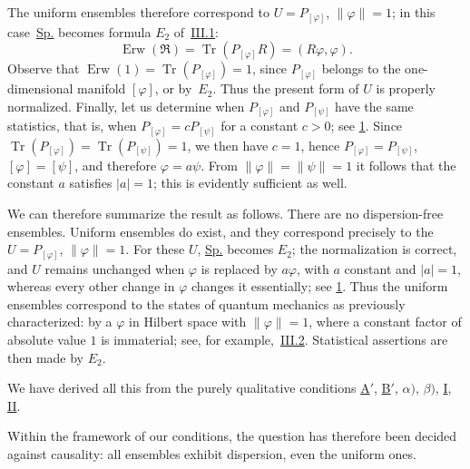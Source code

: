 \documentclass[fontsize=13pt,twoside,openany,headings=normal,parskip=false,bookmarkpackage=false,DIV=calc]{scrbook}
\begin{document}
The uniform ensembles therefore correspond to $U=P_{[\varphi]}$, $\|\varphi\|=1$; in this case~\hyperref[eq:IV.2.Sp]{Sp.} becomes formula \hyperref[post:III.1.E2]{$E_2$} of~\hyperref[sec:III.1]{III.1}:
\begin{equation}\tag{$E_2$}\label{eq:IV.2.E2}
\operatorname{Erw}(\mathfrak R)=\operatorname{Tr}(P_{[\varphi]}R)=(R\varphi,\varphi).
\end{equation}
Observe that $\operatorname{Erw}(1)=\operatorname{Tr}(P_{[\varphi]})=1$, since $P_{[\varphi]}$ belongs to the one-dimensional manifold $[\varphi]$, or by~\hyperref[eq:IV.2.E2]{$E_2$}. Thus the present form of $U$ is properly normalized. Finally, let us determine when $P_{[\varphi]}$ and $P_{[\psi]}$ have the same statistics, that is, when $P_{[\varphi]}=cP_{[\psi]}$ for a constant $c>0$; see \hyperref[remark:IV.2.1]{1}. Since $\operatorname{Tr}(P_{[\varphi]})=\operatorname{Tr}(P_{[\psi]})=1$, we then have $c=1$, hence $P_{[\varphi]}=P_{[\psi]}$, $[\varphi]=[\psi]$, and therefore $\varphi=a\psi$. From $\|\varphi\|=\|\psi\|=1$ it follows that the constant $a$ satisfies $|a|=1$; this is evidently sufficient as well.

We can therefore summarize the result as follows. There are no dispersion-free ensembles. Uniform ensembles do exist, and they correspond precisely to the $U=P_{[\varphi]}$, $\|\varphi\|=1$. For these $U$, \hyperref[eq:IV.2.Sp]{Sp.} becomes \hyperref[eq:IV.2.E2]{$E_2$}; the normalization is correct, and $U$ remains unchanged when $\varphi$ is replaced by $a\varphi$, with $a$ constant and $|a|=1$, whereas every other change in $\varphi$ changes it essentially; see \hyperref[remark:IV.2.1]{1}. Thus the uniform ensembles correspond to the states of quantum mechanics as previously characterized: by a $\varphi$ in Hilbert space with $\|\varphi\|=1$, where a constant factor of absolute value $1$ is immaterial; see, for example,~\hyperref[sec:III.2]{III.2}. Statistical assertions are then made by \hyperref[eq:IV.2.E2]{$E_2$}.

We have derived all this from the purely qualitative conditions \hyperref[cond:IV.Aprime]{A$'$}, \hyperref[cond:IV.Bprime]{B$'$}, \hyperref[def:IV.1.alpha]{$\alpha)$}, \hyperref[def:IV.1.beta]{$\beta)$}, \hyperref[cond:IV.2.I]{I}, \hyperref[cond:IV.2.II]{II}.

Within the framework of our conditions, the question has therefore been decided against causality: all ensembles exhibit dispersion, even the uniform ones.
\end{document}

